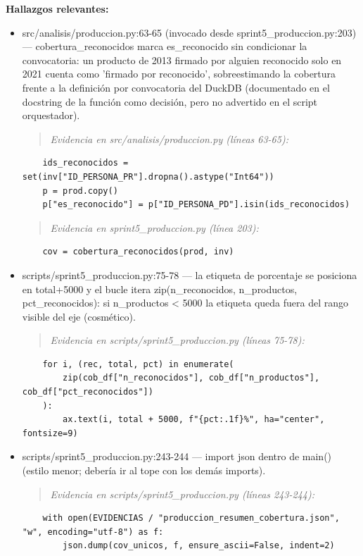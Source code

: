 \textbf{Hallazgos relevantes:}
\begin{itemize}
  \item src/analisis/produccion.py:63-65 (invocado desde sprint5\_produccion.py:203) --- cobertura\_reconocidos marca es\_reconocido sin condicionar la convocatoria: un producto de 2013 firmado por alguien reconocido solo en 2021 cuenta como 'firmado por reconocido', sobreestimando la cobertura frente a la definición por convocatoria del DuckDB (documentado en el docstring de la función como decisión, pero no advertido en el script orquestador).
\begin{quote}\footnotesize\ttfamily
\noindent\emph{Evidencia en src/analisis/produccion.py (líneas 63-65):}
\end{quote}
\begin{lstlisting}
    ids_reconocidos = set(inv["ID_PERSONA_PR"].dropna().astype("Int64"))
    p = prod.copy()
    p["es_reconocido"] = p["ID_PERSONA_PD"].isin(ids_reconocidos)
\end{lstlisting}

\begin{quote}\footnotesize\ttfamily
\noindent\emph{Evidencia en sprint5\_produccion.py (línea 203):}
\end{quote}
\begin{lstlisting}
    cov = cobertura_reconocidos(prod, inv)
\end{lstlisting}

  \item scripts/sprint5\_produccion.py:75-78 --- la etiqueta de porcentaje se posiciona en total+5000 y el bucle itera zip(n\_reconocidos, n\_productos, pct\_reconocidos): si n\_productos < 5000 la etiqueta queda fuera del rango visible del eje (cosmético).
\begin{quote}\footnotesize\ttfamily
\noindent\emph{Evidencia en scripts/sprint5\_produccion.py (líneas 75-78):}
\end{quote}
\begin{lstlisting}
    for i, (rec, total, pct) in enumerate(
        zip(cob_df["n_reconocidos"], cob_df["n_productos"], cob_df["pct_reconocidos"])
    ):
        ax.text(i, total + 5000, f"{pct:.1f}%", ha="center", fontsize=9)
\end{lstlisting}

  \item scripts/sprint5\_produccion.py:243-244 --- import json dentro de main() (estilo menor; debería ir al tope con los demás imports).
\begin{quote}\footnotesize\ttfamily
\noindent\emph{Evidencia en scripts/sprint5\_produccion.py (líneas 243-244):}
\end{quote}
\begin{lstlisting}
    with open(EVIDENCIAS / "produccion_resumen_cobertura.json", "w", encoding="utf-8") as f:
        json.dump(cov_unicos, f, ensure_ascii=False, indent=2)
\end{lstlisting}


\end{itemize}

